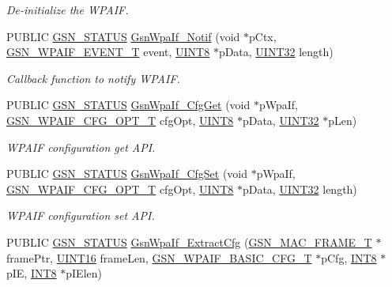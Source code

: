 \begin{DoxyCompactItemize}
\begin{DoxyCompactList}\small\item\em De-\/initialize the WPAIF. \end{DoxyCompactList}\item 
PUBLIC \hyperlink{a00660_gada5951904ac6110b1fa95e51a9ddc217}{GSN\_\-STATUS} \hyperlink{a00687_ga6e525a3280fe21d508c41995dde92810}{GsnWpaIf\_\-Notif} (void $\ast$pCtx, \hyperlink{a00687_ga73929543fff4d9b512803f4cb0e94b47}{GSN\_\-WPAIF\_\-EVENT\_\-T} event, \hyperlink{a00660_gab27e9918b538ce9d8ca692479b375b6a}{UINT8} $\ast$pData, \hyperlink{a00660_gae1e6edbbc26d6fbc71a90190d0266018}{UINT32} length)
\begin{DoxyCompactList}\small\item\em Callback function to notify WPAIF. \end{DoxyCompactList}\item 
PUBLIC \hyperlink{a00660_gada5951904ac6110b1fa95e51a9ddc217}{GSN\_\-STATUS} \hyperlink{a00687_ga491c93619d44c8ec38f554c8e27af35e}{GsnWpaIf\_\-CfgGet} (void $\ast$pWpaIf, \hyperlink{a00687_ga40c2baeb843f878b19724138a045f065}{GSN\_\-WPAIF\_\-CFG\_\-OPT\_\-T} cfgOpt, \hyperlink{a00660_gab27e9918b538ce9d8ca692479b375b6a}{UINT8} $\ast$pData, \hyperlink{a00660_gae1e6edbbc26d6fbc71a90190d0266018}{UINT32} $\ast$pLen)
\begin{DoxyCompactList}\small\item\em WPAIF configuration get API. \end{DoxyCompactList}\item 
PUBLIC \hyperlink{a00660_gada5951904ac6110b1fa95e51a9ddc217}{GSN\_\-STATUS} \hyperlink{a00687_gacafd704886a83992ea38f3f7adf3f931}{GsnWpaIf\_\-CfgSet} (void $\ast$pWpaIf, \hyperlink{a00687_ga40c2baeb843f878b19724138a045f065}{GSN\_\-WPAIF\_\-CFG\_\-OPT\_\-T} cfgOpt, \hyperlink{a00660_gab27e9918b538ce9d8ca692479b375b6a}{UINT8} $\ast$pData, \hyperlink{a00660_gae1e6edbbc26d6fbc71a90190d0266018}{UINT32} length)
\begin{DoxyCompactList}\small\item\em WPAIF configuration set API. \end{DoxyCompactList}\item 
PUBLIC \hyperlink{a00660_gada5951904ac6110b1fa95e51a9ddc217}{GSN\_\-STATUS} \hyperlink{a00687_ga7ee0d07f06c42b115e50d8d0f5c68690}{GsnWpaIf\_\-ExtractCfg} (\hyperlink{a00116}{GSN\_\-MAC\_\-FRAME\_\-T} $\ast$framePtr, \hyperlink{a00660_ga09f1a1fb2293e33483cc8d44aefb1eb1}{UINT16} frameLen, \hyperlink{a00420}{GSN\_\-WPAIF\_\-BASIC\_\-CFG\_\-T} $\ast$pCfg, \hyperlink{a00660_ga307b8734c020247f6bac4fcde0dcfbb9}{INT8} $\ast$pIE, \hyperlink{a00660_ga307b8734c020247f6bac4fcde0dcfbb9}{INT8} $\ast$pIElen)

\end{DoxyCompactItemize}
